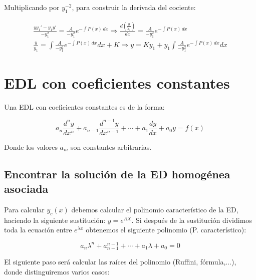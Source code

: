 \documentclass[a4paper,12pt,titlepage]{article}
\begin{document}
Multiplicando por $y_1^{-2}$, para construir la derivada del cociente:

\begin{equation}
    \begin{gathered}
    \frac{yy_1'-y_1y'}{-y_1^2} = \frac{A}{-y_1^2} e^{-\int P(x)\, dx} \Rightarrow \frac{d \left(\frac{y}{y_1}\right)}{dx} = \frac{A}{-y_1^2} e^{-\int P(x)\, dx} \\
    \frac{y}{y_1} = \int \frac{A}{-y_1^2} e^{-\int P(x)\, dx} dx + K \Rightarrow y = Ky_1 + y_1\int \frac{A}{-y_1^2} e^{-\int P(x)\, dx} dx
    \end{gathered}
\end{equation}



\section{EDL con coeficientes constantes}

Una EDL con coeficientes constantes es de la forma:

\begin{equation}
    a_n \frac{d^n y}{d x^n}+a_{n-1} \frac{d^{n-1} y}{d x^{n-1}}+\cdots+a_1 \frac{d y}{d x}+a_0 y=f(x)
\end{equation}

Donde los valores $a_m$ son constantes arbitrarias.

\subsection{Encontrar la solución de la ED homogénea asociada}

Para calcular $y_c(x)$ debemos calcular el polinomio característico de la ED, haciendo la siguiente sustitución: $y= e^{\Lambda X}$. Si después de la sustitución dividimos toda la ecuación entre $e^{\lambda x}$ obtenemos el siguiente polinomio (P. característico):

\begin{equation}
    a_n\lambda^n + a_{n-1}^{n-1} + \cdots + a_1\lambda + a_0 = 0
\end{equation}

El siguiente paso será calcular las raíces del polinomio (Ruffini, fórmula,...), donde distinguiremos varios casos:
\end{document}
